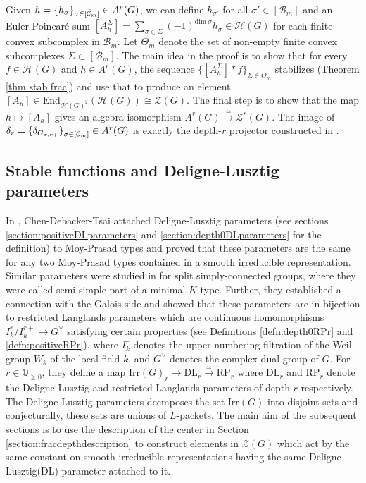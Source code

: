 \documentclass[11 pt]{article}
\numberwithin{equation}{subsection}
\theoremstyle{definition}
\theoremstyle{remark}
\theoremstyle{conjecture}
\newcommand{\Irr}{\mathrm{Irr}}
\newcommand{\DL}{\mathrm{DL}}
\newcommand{\RP}{\mathrm{RP}}
\newcommand{\Q}{\mathbb Q}
\newcommand{\HH}{\mathcal H}
\newcommand{\B}{\mathcal{B}}
\newcommand{\ZZ}{\mathcal{Z}}
\newcommand{\mc}{\mathcal}
\newcommand{\mcC}{\mathcal C}
\begin{document}
Given $h=\{ h_\sigma\}_{\sigma\in [\Bar{\mcC}_m]}\in A^r(G)$, we can define $h_{\sigma'}$ for all $\sigma' \in [\B_m]$ and an Euler-Poincar\'e sum $[A^\Sigma_h] = \sum_{\sigma \in \Sigma }(-1)^{\text{dim} \: \sigma} h_\sigma \in \HH(G)$ for each finite convex subcomplex in $\B_m$.  Let $\Theta_m$ denote the set of non-empty finite convex subcomplexes $\Sigma \subset [\B_m]$. The main idea in the proof is to show that for every $f\in \mc H(G)$ and $h\in A^r(G)$, the sequence $\{[A^\Sigma_h] * f\}_{\Sigma \in \Theta_m} $ stabilizes (Theorem \ref{thm stab frac}) and use that to produce an element $[A_h] \in \mathrm{End}_{\HH(G)^{2}}(\HH(G)) \cong \ZZ(G)$. The final step is to show that the map $h \mapsto [A_h]$ gives an algebra isomorphism $A^r(G) \xrightarrow{\simeq} \ZZ^r(G)$. The image of $\delta_r=\{ \delta_{G_{\sigma,r+}}\}_{\sigma\in [\Bar{\mcC}_m]}\in A^r(G)$ is exactly the depth-$r$ projector constructed in \cite{BKV2}. 

\subsection{Stable functions and Deligne-Lusztig parameters}

 
In \cite{chendebackertsai}, Chen-Debacker-Tsai attached Deligne-Lusztig parameters (see sections \ref{section:positiveDLparameters} and \ref{section:depth0DLparameters} for the definition) to Moy-Prasad types and proved that these parameters are the same for any two Moy-Prasad types contained in a smooth irreducible representation. Similar parameters were studied in \cite{cb24} for split simply-connected groups, where they were called semi-simple part of a minimal $K$-type. Further, they established a connection with the Galois side and showed that these parameters are in bijection to restricted Langlands parameters which are continuous homomorphisms $I_k^r/I^{r+}_k \rightarrow G^\vee$ satisfying certain properties (see Definitions \ref{defn:depth0RPr} and \ref{defn:positiveRPr}), where $I_k^{r}$ denotes the upper numbering filtration of the Weil group $W_k$ of the local field $k$, and $G^\vee$ denotes the complex dual group of $G$. For $r \in \Q_{\geq 0}$, they define a map $\Irr(G)_r\rightarrow \DL_r\xrightarrow{\simeq}\RP_r$ where $\DL_r$ and $\RP_r$ denote the Deligne-Lusztig and restricted Langlands parameters of depth-$r$ respectively. The Deligne-Lusztig parameters decmposes the set $\Irr(G)$ into disjoint sets and conjecturally, these sets are unions of $L$-packets. The main aim of the subsequent sections is to use the description of the center in Section \ref{section:fracdepthdescription} to construct elements in $\ZZ(G)$ which act by the same constant on smooth irreducible representations having the same Deligne-Lusztig(DL) parameter attached to it.  \par
\end{document}
